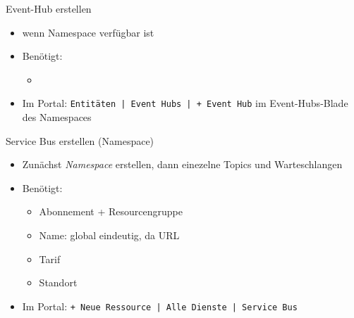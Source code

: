 \begin{flashcard}[Definition]{Event-Hub erstellen}
    \begin{itemize}
        \item wenn Namespace verfügbar ist
        \item Benötigt:
            \begin{itemize}
                \item
            \end{itemize}
        \item Im Portal: \texttt{Entitäten | Event Hubs | + Event Hub} im Event-Hubs-Blade des Namespaces
    \end{itemize}
\end{flashcard}

\begin{flashcard}[Definition]{Service Bus erstellen (Namespace)}
    \begin{itemize}
        \item Zunächst \emph{Namespace} erstellen, dann einezelne Topics und Warteschlangen
        \item Benötigt:
            \begin{itemize}
                \item Abonnement + Resourcengruppe
                \item Name: global eindeutig, da URL
                \item Tarif
                \item Standort
            \end{itemize}
        \item Im Portal: \texttt{+ Neue Ressource | Alle Dienste | Service Bus}
    \end{itemize}
\end{flashcard}

